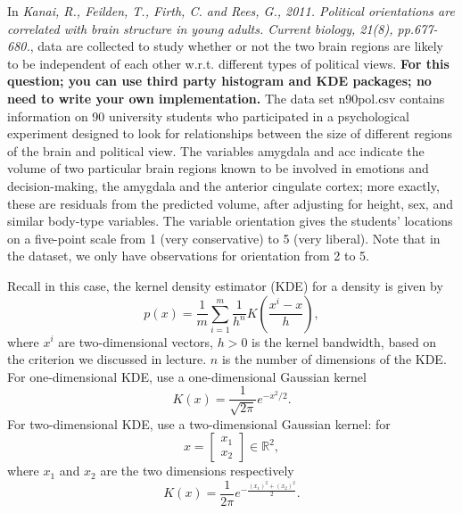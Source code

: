 \documentclass[12pt]{article}
\begin{document}
In {\it Kanai, R., Feilden, T., Firth, C. and Rees, G., 2011. Political orientations are correlated with brain structure in young adults. Current biology, 21(8), pp.677-680.}, data are collected to  study whether or not the two brain regions are likely to be independent of each other w.r.t. different types of political views. \textbf{For this question; you can use third party histogram and KDE packages; no need to write your own implementation.} The data set \textsf{n90pol.csv} contains information on 90 university students who participated in a psychological experiment designed to look for relationships between the size of different regions of the brain and political view. The variables \textsf{amygdala} and \textsf{acc} indicate the volume of two particular brain regions known to be involved in emotions and decision-making, the amygdala and the anterior cingulate cortex; more exactly, these are residuals from the predicted volume, after adjusting for height, sex, and similar body-type variables. The variable \textsf{orientation} gives the students' locations on a five-point scale from 1 (very conservative) to 5 (very liberal).  Note that in the dataset, we only have observations for orientation from 2 to 5. 

Recall in this case, the kernel density estimator (KDE) for a density is given by
 \[
 p(x) = \frac 1 m \sum_{i=1}^m \frac{1}{h^n}
 K\left(
 \frac{x^i - x}{h}
 \right),
 \]
where $x^i$ are two-dimensional vectors, $h >0$ is the kernel bandwidth, based on the criterion we discussed in lecture. $n$ is the number of dimensions of the KDE.
For one-dimensional KDE,  use a one-dimensional Gaussian kernel
\[
K(x) = \frac{1}{\sqrt{2\pi}} e^{-x^2/2}.
\]
For two-dimensional KDE, use a two-dimensional Gaussian kernel: for \[x = \begin{bmatrix}x_1\\x_2\end{bmatrix}\in \mathbb R^2,\] where $x_1$ and $x_2$ are the two dimensions respectively \[K(x) = \frac{1}{2\pi} e^{-\frac{(x_1)^2 + (x_2)^2}{2}}.\] 
  
\end{document}
